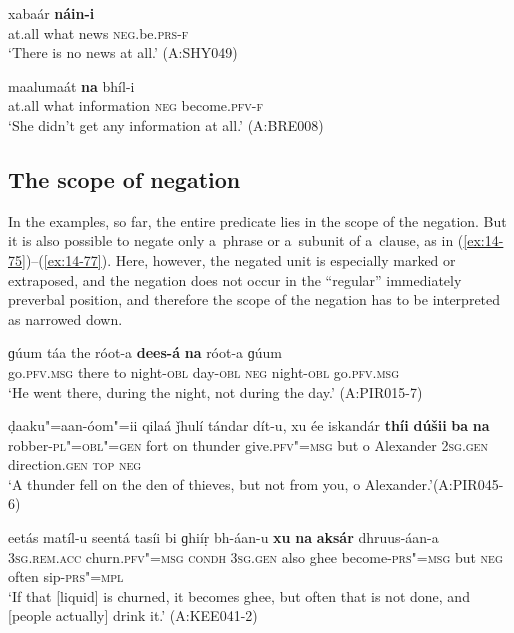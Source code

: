 \begin{exe}
\ex
\label{ex:14-73}
\gll [hiǰ ɡa] xabaár \textbf{náin-i} \\
at.all what news \textsc{neg}.be.\textsc{prs-f}  \\
\glt `There is no news at all.' (A:SHY049)

\ex
\label{ex:14-74}
\gll [hiǰ ɡa] maalumaát \textbf{na} bhíl-i \\
at.all what information \textsc{neg} become.\textsc{pfv-f } \\
\glt `She didn't get any information at all.' (A:BRE008)
\end{exe}

\subsection{The scope of negation}
\label{subsec:14-3-3}


 In the examples, so far, the entire predicate lies in the scope of the negation. But it is also possible to negate only a~phrase or a~subunit of a~clause, as in (\ref{ex:14-75})--(\ref{ex:14-77}). Here, however, the negated unit is especially marked or extraposed, and the negation does not occur in the ``regular'' immediately preverbal position, and therefore the scope of the negation has to be interpreted as narrowed down. 

\begin{exe}
\ex
\label{ex:14-75}
\gll ɡúum táa the róot-a \textbf{dees-á} \textbf{na} róot-a  ɡúum \\
go.\textsc{pfv.msg} there to night-\textsc{obl} day-\textsc{obl} \textsc{neg} night-\textsc{obl}  go.\textsc{pfv.msg}  \\
\glt `He went there, during the night, not during the day.' (A:PIR015-7)

\ex
\label{ex:14-76}
\gll ḍaaku"=aan-óom"=ii qilaá ǰhulí tándar dít-u, xu ée iskandár \textbf{thíi} \textbf{dúšii} \textbf{ba} \textbf{na} \\
robber-\textsc{pl"=obl"=gen} fort on thunder give.\textsc{pfv"=msg} but o Alexander \textsc{2sg.gen} direction.\textsc{gen} \textsc{top} \textsc{neg} \\
\glt `A thunder fell on the den of thieves, but not from you, o Alexander.'\newline (A:PIR045-6)

\ex
\label{ex:14-77}
\gll eetás matíl-u seentá tasíi bi ɡhiíṛ  bh-áan-u \textbf{xu} \textbf{na} \textbf{aksár} dhruus-áan-a\\
\textsc{3sg.rem.acc} churn.\textsc{pfv"=msg} \textsc{condh} \textsc{3sg.gen} also ghee  become-\textsc{prs"=msg} but \textsc{neg} often sip-\textsc{prs"=mpl}  \\
\glt `If that [liquid] is churned, it becomes ghee, but often that is not done, and [people actually] drink it.' (A:KEE041-2)
\end{exe}

